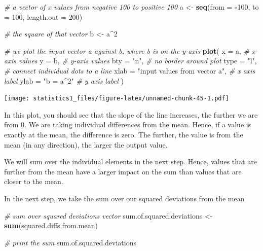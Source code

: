 \documentclass[]{article}
\newenvironment{Shaded}{\begin{snugshade}}{\end{snugshade}}
\newcommand{\KeywordTok}[1]{\textcolor[rgb]{0.13,0.29,0.53}{\textbf{#1}}}
\newcommand{\DataTypeTok}[1]{\textcolor[rgb]{0.13,0.29,0.53}{#1}}
\newcommand{\DecValTok}[1]{\textcolor[rgb]{0.00,0.00,0.81}{#1}}
\newcommand{\StringTok}[1]{\textcolor[rgb]{0.31,0.60,0.02}{#1}}
\newcommand{\CommentTok}[1]{\textcolor[rgb]{0.56,0.35,0.01}{\textit{#1}}}
\newcommand{\OperatorTok}[1]{\textcolor[rgb]{0.81,0.36,0.00}{\textbf{#1}}}
\newcommand{\NormalTok}[1]{#1}
\theoremstyle{definition}
\theoremstyle{definition}
\theoremstyle{definition}
\theoremstyle{remark}
\begin{document}
\begin{Shaded}
\begin{Highlighting}[]
\CommentTok{# a vector of x values from negative 100 to positive 100}
\NormalTok{a <-}\StringTok{ }\KeywordTok{seq}\NormalTok{(}\DataTypeTok{from =} \OperatorTok{-}\DecValTok{100}\NormalTok{, }\DataTypeTok{to =} \DecValTok{100}\NormalTok{, }\DataTypeTok{length.out =} \DecValTok{200}\NormalTok{)}

\CommentTok{# the square of that vector}
\NormalTok{b <-}\StringTok{ }\NormalTok{a}\OperatorTok{^}\DecValTok{2}

\CommentTok{# we plot the input vector a against b, where b is on the y-axis}
\KeywordTok{plot}\NormalTok{(}
  \DataTypeTok{x =}\NormalTok{ a, }\CommentTok{# x-axis values}
  \DataTypeTok{y =}\NormalTok{ b, }\CommentTok{# y-axis values}
  \DataTypeTok{bty =} \StringTok{"n"}\NormalTok{, }\CommentTok{# no border around plot}
  \DataTypeTok{type =} \StringTok{"l"}\NormalTok{, }\CommentTok{# connect individual dots to a line}
  \DataTypeTok{xlab =} \StringTok{"input values from vector a"}\NormalTok{, }\CommentTok{# x axis label}
  \DataTypeTok{ylab =} \StringTok{"b = a^2"} \CommentTok{# y axis label}
\NormalTok{)}
\end{Highlighting}
\end{Shaded}

\texttt{[image: statistics1\_files/figure-latex/unnamed-chunk-45-1.pdf]}

In this plot, you should see that the slope of the line increases, the
further we are from 0. We are taking individual differences from the
mean. Hence, if a value is exactly at the mean, the difference is zero.
The further, the value is from the mean (in any direction), the larger
the output value.

We will sum over the individual elements in the next step. Hence, values
that are further from the mean have a larger impact on the sum than
values that are closer to the mean.

In the next step, we take the sum over our squared deviations from the
mean

\begin{Shaded}
\begin{Highlighting}[]
\CommentTok{# sum over squared deviations vector}
\NormalTok{sum.of.squared.deviations <-}\StringTok{ }\KeywordTok{sum}\NormalTok{(squared.diffs.from.mean)}

\CommentTok{# print the sum}
\NormalTok{sum.of.squared.deviations}
\end{Highlighting}
\end{Shaded}
\end{document}
